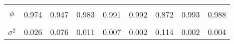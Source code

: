 \begin{footnotesize}
\begin{singlespace}
\begin{tabular}{ccccccccc}
 & \begin{tiny} [-0.16,-0.014] \end{tiny}  & \begin{tiny} [0.444,0.579] \end{tiny}  & \begin{tiny} [-0.296,-0.135] \end{tiny}  & \begin{tiny} [0.312,0.535] \end{tiny}  & \begin{tiny} [-1.716,-1.632] \end{tiny}  & \begin{tiny} [-1.43,-1.386] \end{tiny}  & \begin{tiny} [-1.716,-1.631] \end{tiny}  & \begin{tiny} [-1.546,-1.464] \end{tiny}  \\ 
$ \phi $ & 0.974 & 0.947 & 0.983 & 0.991 & 0.992 & 0.872 & 0.993 & 0.988 \\ 
 & \begin{tiny} [0.966,0.981] \end{tiny}  & \begin{tiny} [0.934,0.96] \end{tiny}  & \begin{tiny} [0.978,0.989] \end{tiny}  & \begin{tiny} [0.988,0.994] \end{tiny}  & \begin{tiny} [0.99,0.994] \end{tiny}  & \begin{tiny} [0.858,0.887] \end{tiny}  & \begin{tiny} [0.991,0.994] \end{tiny}  & \begin{tiny} [0.985,0.991] \end{tiny}  \\ 
$ \sigma^{2} $ & 0.026 & 0.076 & 0.011 & 0.007 & 0.002 & 0.114 & 0.002 & 0.004 \\ 

\end{tabular}
\end{singlespace}
\end{footnotesize}
